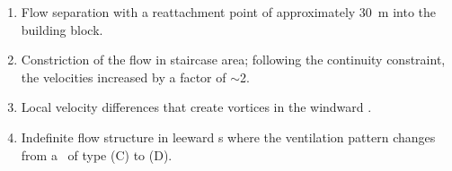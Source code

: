 \begin{enumerate}[label=(\Alph*)]
	
	\item Flow separation with a reattachment point of approximately \SI{30}{m} into the building block.
	
	\item  Constriction of the flow in staircase area; following the continuity constraint,  the velocities increased by a factor of $\sim$\num{2}.
	
	\item Local velocity differences that create vortices in the windward \CR.
	
	\item  Indefinite flow structure in leeward \CR s where the ventilation pattern changes from a \CR\ of type (C) to (D).
	
\end{enumerate}





